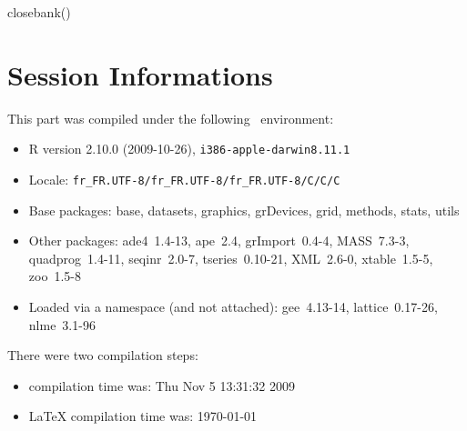 \documentclass{article}
\begin{document}
\begin{Schunk}
\begin{Sinput}
 closebank()
\end{Sinput}
\end{Schunk}


\section*{Session Informations}

\begin{scriptsize}

This part was compiled under the following \Rlogo{}~environment:

\begin{itemize}\raggedright
  \item R version 2.10.0 (2009-10-26), \verb|i386-apple-darwin8.11.1|
  \item Locale: \verb|fr_FR.UTF-8/fr_FR.UTF-8/fr_FR.UTF-8/C/C/C|
  \item Base packages: base, datasets, graphics, grDevices, grid,
    methods, stats, utils
  \item Other packages: ade4~1.4-13, ape~2.4, grImport~0.4-4,
    MASS~7.3-3, quadprog~1.4-11, seqinr~2.0-7, tseries~0.10-21,
    XML~2.6-0, xtable~1.5-5, zoo~1.5-8
  \item Loaded via a namespace (and not attached): gee~4.13-14,
    lattice~0.17-26, nlme~3.1-96
\end{itemize}
There were two compilation steps:

\begin{itemize}
  \item \Rlogo{} compilation time was: Thu Nov  5 13:31:32 2009
  \item \LaTeX{} compilation time was: \today
\end{itemize}

\end{scriptsize}


\clearpage
{}


\end{document}
